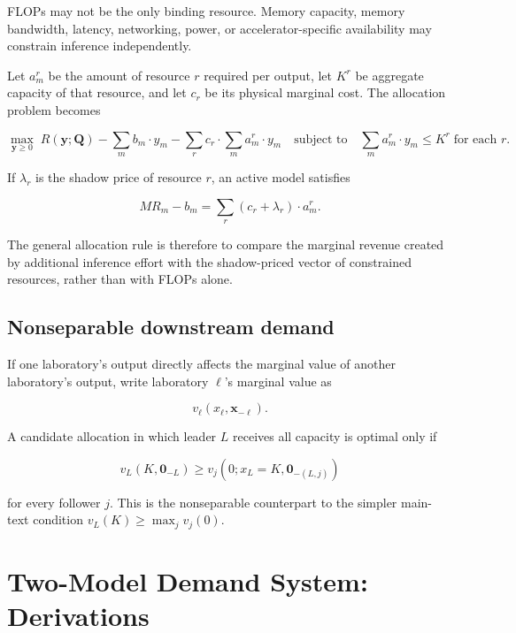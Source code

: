 \documentclass[11pt]{article}
\begin{document}
FLOPs may not be the only binding resource. Memory capacity, memory bandwidth, latency, networking, power, or accelerator-specific availability may constrain inference independently.

Let $a_m^r$ be the amount of resource $r$ required per output, let $K^r$ be aggregate capacity of that resource, and let $c_r$ be its physical marginal cost. The allocation problem becomes

\begin{equation}\max_{\mathbf y\geq0}\;R(\mathbf y;\mathbf Q)-\sum_m b_m\cdot y_m-\sum_r c_r\cdot\sum_m a_m^r\cdot y_m\quad\text{subject to}\quad\sum_m a_m^r\cdot y_m\leq K^r\;\text{for each }r.\end{equation}

If $\lambda_r$ is the shadow price of resource $r$, an active model satisfies

\begin{equation}MR_m-b_m=\sum_r\left(c_r+\lambda_r\right)\cdot a_m^r.\end{equation}

The general allocation rule is therefore to compare the marginal revenue created by additional inference effort with the shadow-priced vector of constrained resources, rather than with FLOPs alone.

\subsection{Nonseparable downstream demand}

If one laboratory's output directly affects the marginal value of another laboratory's output, write laboratory $\ell$'s marginal value as

\begin{equation}v_\ell(x_\ell,\mathbf x_{-\ell}).\end{equation}

A candidate allocation in which leader $L$ receives all capacity is optimal only if

\begin{equation}v_L(K,\mathbf 0_{-L})\geq v_j\left(0;x_L=K,\mathbf 0_{-(L,j)}\right)\end{equation}

for every follower $j$. This is the nonseparable counterpart to the simpler main-text condition $v_L(K)\geq\max_j v_j(0)$.

\section{Two-Model Demand System: Derivations}
\label{app:two-model}
\end{document}
